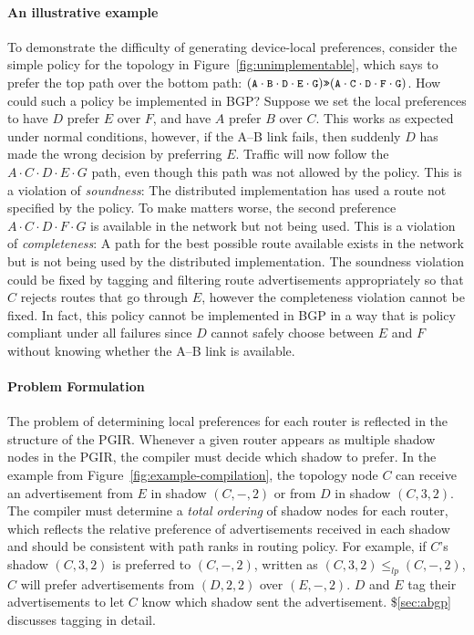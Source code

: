 \documentclass[10pt]{sigalternate052015}
\newcommand{\para}[1]{\paragraph*{\textbf{#1}}}
\newcommand{\CD}[1]{\texttt{\small #1}}  %
\newcommand{\Prefer}{\texttt{>>}}
\begin{document}
\para{An illustrative example}

To demonstrate the difficulty of generating device-local preferences, consider the simple policy for the topology in Figure~\ref{fig:unimplementable}, which says to prefer the top path over the bottom path:
%
$(\CD{A} \cdot \CD{B} \cdot \CD{D} \cdot \CD{E} \cdot \CD{G})  \Prefer (\CD{A} \cdot \CD{C} \cdot \CD{D} \cdot \CD{F} \cdot \CD{G})$.
%
How could such a policy be implemented in BGP? Suppose we set the local preferences to have $D$ prefer $E$ over $F$, and have $A$ prefer $B$ over $C$. This works as expected under normal conditions, however, if the A--B link fails, then suddenly $D$ has made the wrong decision by preferring $E$. Traffic will now follow the
$A \cdot C \cdot D \cdot E \cdot G$ path, even though this path was not allowed by the policy. This is a violation of \emph{soundness}: The distributed implementation has used a route not specified by the policy. To make matters worse, the second preference $A \cdot C \cdot D \cdot F \cdot G$ is available in the network but not being used. This is a violation of \emph{completeness}: A path for the best possible route available exists in the network but is not being used by the distributed implementation.
%
The soundness violation could be fixed by tagging and filtering route advertisements appropriately so that $C$ rejects routes that go through $E$, however the completeness violation cannot be fixed. In fact, this policy cannot be implemented in BGP in a way that is policy compliant under all failures since $D$ cannot safely choose between $E$ and $F$ without knowing whether the A--B link is available.


\para{Problem Formulation}

The problem of determining local preferences for each router is reflected in the structure of the PGIR. Whenever a given router appears as multiple shadow nodes in the PGIR, the compiler must decide which shadow to prefer.
%
In the example from Figure~\ref{fig:example-compilation}, the topology node $C$ can receive an advertisement from $E$ in shadow $(C,-,2)$ or from $D$ in shadow $(C,3,2)$.
%
%
The compiler must determine a \emph{total ordering} of shadow nodes for each router, which reflects the relative preference of advertisements received in each shadow and should be consistent with path ranks in routing policy.
%
For example, if $C$'s shadow $(C,3,2)$ is preferred to $(C,-,2)$, written as $(C,3,2) \leq_{lp} (C,-,2)$,  $C$ will prefer advertisements from $(D,2,2)$ over $(E,-,2)$. $D$ and $E$ tag their advertisements to let $C$ know which shadow sent the advertisement. \$\ref{sec:abgp} discusses tagging in detail.
\end{document}
